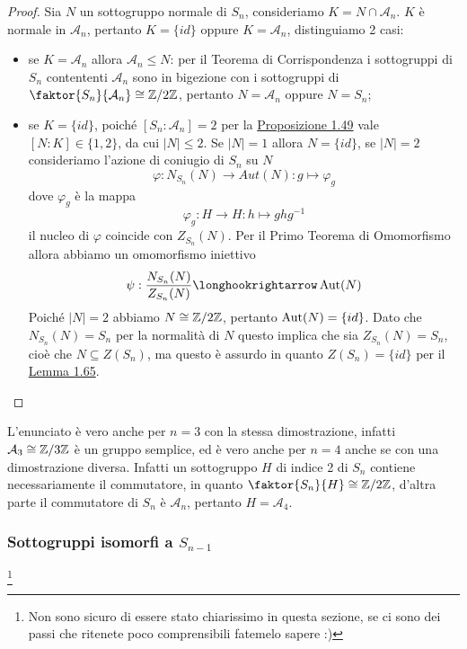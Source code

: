 \documentclass[11pt]{scrartcl}
\begin{document}
\begin{proof}
    Sia $N$ un sottogruppo normale di $S_n$, consideriamo $K= N \cap \mathcal{A}_n$.
    $K$ è normale in $\mathcal{A}_n$, pertanto $K = \{id\}$ oppure $K = \mathcal{A}_n$,
    distinguiamo 2 casi:
    \begin{itemize}
        \item se $K = \mathcal{A}_n$ allora $\mathcal{A}_n \leqslant N$: per il
        Teorema di Corrispondenza i sottogruppi di $S_n$ contententi $\mathcal{A}_n$
        sono in bigezione con i sottogruppi di $\faktor{S_n}{\mathcal{A}_n}\cong \Z2$,
        pertanto $N = \mathcal{A}_n$ oppure $N = S_n$;
        \item se $K = \{id\}$, poiché $[S_n:\mathcal{A}_n] = 2$ per la 
        \hyperref[prop1.49]{Proposizione 1.49} vale $[N:K] \in \{1, 2\}$, 
        da cui $|N| \leq 2$. Se $|N| = 1$ allora $N = \{id\}$, se $|N| = 2$
        consideriamo l'azione di coniugio di $S_n$ su $N$
        \[
            \varphi: N_{S_n}(N)\longrightarrow Aut(N): g \longmapsto \varphi_g
        \]
        dove $\varphi_g$ è la mappa
        \[
            \varphi_g:H \longrightarrow H :h \longmapsto ghg^{-1}
        \]
        il nucleo di $\varphi$ coincide con $Z_{S_n}(N)$. Per il Primo Teorema
        di Omomorfismo allora abbiamo un omomorfismo iniettivo
        \[
            \psi :\frac{N_{S_n}(N)}{Z_{S_n}(N)}\longhookrightarrow \Aut(N)
        \]
        Poiché $|N| = 2$ abbiamo $N \cong \mathbb{Z}/{2}\mathbb{Z}$, pertanto $\operatorname{Aut}(N) = \{id\}$. 
        Dato che $N_{S_n}(N) = S_n$ per la normalità di $N$ questo implica che
        sia $Z_{S_n}(N) = S_n$, cioè che $N \subseteq Z(S_n)$, ma questo è assurdo
        in quanto $Z(S_n) = \{id\}$ per il \hyperref[lemma1.65]{Lemma 1.65}.
    \end{itemize}
\end{proof}

\begin{remark}
    L'enunciato è vero anche per $n = 3$ con la stessa dimostrazione, infatti
    $\mathcal{A}_3 \cong \mathbb{Z}/{3}\mathbb{Z}$ è un gruppo semplice, ed è vero anche per $n = 4$
    anche se con una dimostrazione diversa. Infatti un sottogruppo $H$ di 
    indice 2 di $S_n$ contiene necessariamente il commutatore, in quanto
    $\faktor{S_n}{H}\cong \Z2$, d'altra parte il commutatore di $S_n$ è 
    $\mathcal{A}_n$, pertanto $H = \mathcal{A}_4$.
\end{remark}


\subsubsection{Sottogruppi isomorfi a $S_{n - 1}$}\footnote{
    Non sono sicuro di essere stato chiarissimo in questa sezione, se ci 
    sono dei passi che ritenete poco comprensibili fatemelo sapere :)
}
\end{document}
